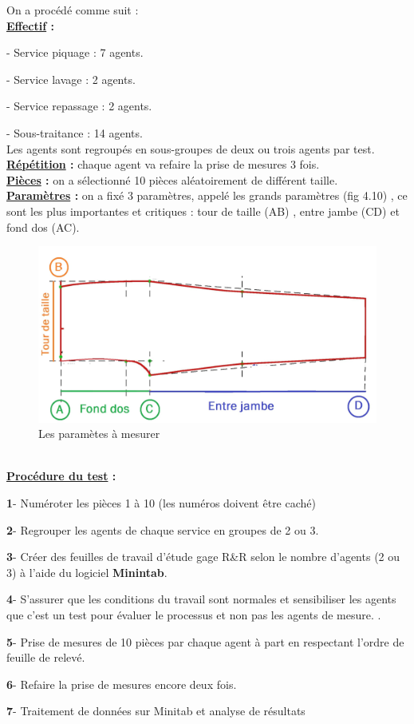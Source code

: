 \documentclass[12pt, a4paper]{thesis}
\begin{document}
On a procédé comme suit :\\
\textbf{\underline{Effectif} :}
\item - Service piquage : 7 agents.
\item - Service lavage : 2 agents.
\item - Service repassage : 2 agents.
\item - Sous-traitance : 14 agents.\\
Les agents sont regroupés en sous-groupes de deux ou trois agents par test.\\
\textbf{\underline{Répétition} :} chaque agent va refaire la prise de mesures 3 fois.\\
\textbf{\underline{Pièces} :} on a sélectionné 10 pièces aléatoirement de différent taille.\\
\textbf{\underline{Paramètres} :} on a fixé 3 paramètres, appelé les grands paramètres (fig 4.10) , ce sont les plus importantes et critiques : tour de taille (AB) , entre jambe (CD) et fond dos (AC).\\
\begin{figure}[!h]
\begin{center}
\includegraphics[scale=0.2]{pantalon.jpg}
\caption{Les paramètes à mesurer}
\end{center}
\end{figure}\\

\textbf{\underline{Procédure du test} :} 
\item \textbf{1}- Numéroter les pièces 1 à 10 (les numéros doivent être caché)
\item \textbf{2}- Regrouper les agents de chaque service en groupes de 2 ou 3.
\item \textbf{3}- Créer des feuilles de travail d'étude gage R\&R selon le nombre d'agents (2 ou 3) à l'aide du logiciel \textbf{Minintab}.
\item \textbf{4}- S'assurer que les conditions du travail sont normales et sensibiliser les agents que c'est un test pour évaluer le processus et non pas les agents de mesure. 
.
\item \textbf{5}- Prise de mesures de 10 pièces par chaque agent à part en respectant l'ordre de feuille de relevé.
\item \textbf{6}- Refaire la prise de mesures encore deux fois.
\item \textbf{7}- Traitement de données sur Minitab et analyse de résultats
\end{document}
